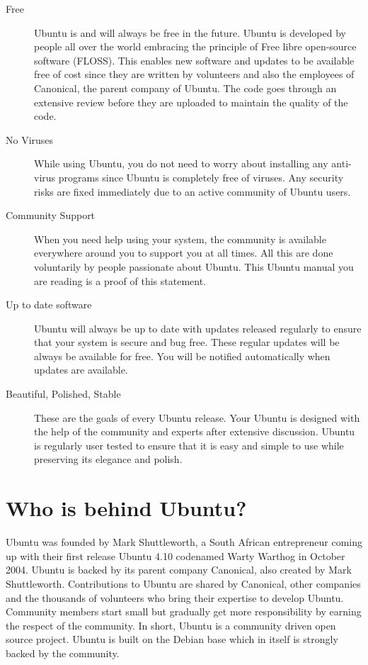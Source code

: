 \begin{description}
\item [Free] Ubuntu is and will always be free in the future. Ubuntu is developed by people all over the world embracing the principle of Free libre open-source software (FLOSS). This enables new software and updates to be available free of cost since they are written by volunteers and also the employees of Canonical, the parent company of Ubuntu. The code goes through an extensive review before they are uploaded to maintain the quality of the code.

\item [No Viruses] While using Ubuntu, you do not need to worry about installing any anti-virus programs since Ubuntu is completely free of viruses. Any security risks are fixed immediately due to an active community of Ubuntu users. 

\item [Community Support] When you need help using your system, the community is available everywhere around you to support you at all times. All this are done voluntarily by people passionate about Ubuntu. This Ubuntu manual you are reading is a proof of this statement. 

\item [Up to date software] Ubuntu will always be up to date with updates released regularly to ensure that your system is secure and bug free. These regular updates will be always be available for free. You will be notified automatically when updates are available.

\item [Beautiful, Polished, Stable] These are the goals of every Ubuntu release. Your Ubuntu is designed with the help of the community and experts after extensive discussion. Ubuntu is regularly user tested to ensure that it is easy and simple to use while preserving its elegance and polish.
\end{description}

\section{Who is behind Ubuntu?} \label{chap:about_ubuntu_who} 
Ubuntu was founded by Mark Shuttleworth, a South African entrepreneur coming up with their first release Ubuntu 4.10 codenamed Warty Warthog in October 2004. Ubuntu is backed by its parent company Canonical, also created by Mark Shuttleworth. Contributions to Ubuntu are shared by Canonical, other companies and the thousands of volunteers who bring their expertise to develop Ubuntu. Community members start small but gradually get more responsibility by earning the respect of the community. In short, Ubuntu is a community driven open source project. Ubuntu is built on the Debian base which in itself is strongly backed by the community.


